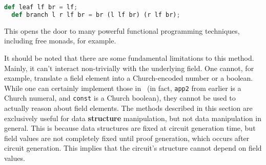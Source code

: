 \begin{lstlisting}[language=Python]
  def leaf lf br = lf;
  def branch l r lf br = br (l lf br) (r lf br);
\end{lstlisting}

This opens the door to many powerful functional programming techniques, including free monads, for example.

It should be noted that there are some fundamental limitations to this method. Mainly, it can't interact non-trivially with the underlying field. One cannot, for example, translate a field element into a Church-encoded number or a boolean. While one can certainly implement those in \vampir\ (in fact, \lstinline|app2| from earlier is a Church numeral, and \lstinline|const| is a Church boolean), they cannot be used to actually reason about field elements. The methods described in this section are exclusively useful for data \textbf{structure} manipulation, but not data manipulation in general. This is because data structures are fixed at circuit generation time, but field values are not completely fixed until proof generation, which occurs after circuit generation. This implies that the circuit's structure cannot depend on field values.